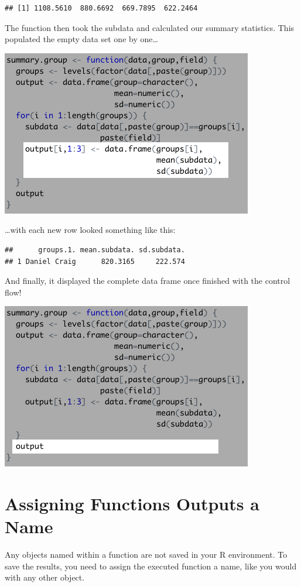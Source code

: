 \documentclass[
]{book}
\begin{document}
\begin{center}
\begin{verbatim}
## [1] 1108.5610  880.6692  669.7895  622.2464
\end{verbatim}

The function then took the subdata and calculated our summary statistics. This populated the empty data set one by one\ldots{}

\begin{center}\includegraphics[width=0.5\linewidth]{1.56_Function_Breakdown} \end{center}

\ldots with each new row looked something like this:

\begin{verbatim}
##      groups.1. mean.subdata. sd.subdata.
## 1 Daniel Craig      820.3165     222.574
\end{verbatim}

And finally, it displayed the complete data frame once finished with the control flow!

\begin{center}\includegraphics[width=0.5\linewidth]{1.57_Function_Breakdown} \end{center}

\hypertarget{assigning-functions-outputs-a-name}{%
\section{Assigning Functions Outputs a Name}\label{assigning-functions-outputs-a-name}}

Any objects named within a function are not saved in your R environment. To save the results, you need to assign the executed function a name, like you would with any other object.


\end{center}
\end{document}
